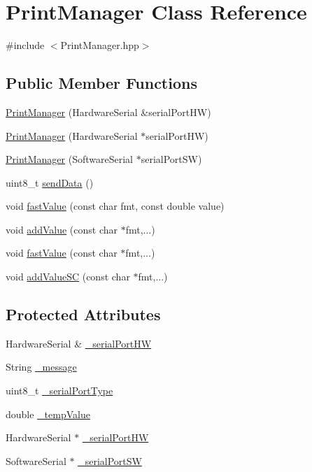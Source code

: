 \hypertarget{class_print_manager}{}\section{Print\+Manager Class Reference}
\label{class_print_manager}


{\ttfamily \#include $<$Print\+Manager.\+hpp$>$}

\subsection*{Public Member Functions}
\begin{DoxyCompactItemize}
\item 
\hyperlink{class_print_manager_a2fd4fea9125cd8ccd857aa21bd1ab921}{Print\+Manager} (Hardware\+Serial \&serial\+Port\+HW)
\item 
\hyperlink{class_print_manager_a587a22b1cc67696f71f5a85bfb130140}{Print\+Manager} (Hardware\+Serial $\ast$serial\+Port\+HW)
\item 
\hyperlink{class_print_manager_ac1212bb44b3c100bd67041d878977058}{Print\+Manager} (Software\+Serial $\ast$serial\+Port\+SW)
\item 
uint8\+\_\+t \hyperlink{class_print_manager_a65b6e94eb17c08725d307293c26922c6}{send\+Data} ()
\item 
void \hyperlink{class_print_manager_aef5dd6437e06e84de5a98c1466f5f074}{fast\+Value} (const char fmt, const double value)
\item 
void \hyperlink{class_print_manager_a27ea0c1977a54e1291d0be0fc0754f48}{add\+Value} (const char $\ast$fmt,...)
\item 
void \hyperlink{class_print_manager_ae091788c5f4baa9df10fb290c67cb693}{fast\+Value} (const char $\ast$fmt,...)
\item 
void \hyperlink{class_print_manager_a553c37331e9a50e193c4f6e6b1e67f73}{add\+Value\+SC} (const char $\ast$fmt,...)
\end{DoxyCompactItemize}
\subsection*{Protected Attributes}
\begin{DoxyCompactItemize}
\item 
Hardware\+Serial \& \hyperlink{class_print_manager_a68416e0bf4a0dc10203c6df2fb5b0dbd}{\+\_\+serial\+Port\+HW}
\item 
String \hyperlink{class_print_manager_a05df6919d0e6af854f9215d20786b026}{\+\_\+message}
\item 
uint8\+\_\+t \hyperlink{class_print_manager_ae1b8f767b738748027e0ac2a97f1be6c}{\+\_\+serial\+Port\+Type}
\item 
double \hyperlink{class_print_manager_a550ad6ba340af9c4f689b8e25bd420f3}{\+\_\+temp\+Value}
\item 
Hardware\+Serial $\ast$ \hyperlink{class_print_manager_a19cd58c07357e6142b92ed4598cda1bc}{\+\_\+serial\+Port\+HW}
\item 
Software\+Serial $\ast$ \hyperlink{class_print_manager_aa079f14838d51ffd18ac814323c3d177}{\+\_\+serial\+Port\+SW}
\end{DoxyCompactItemize}


